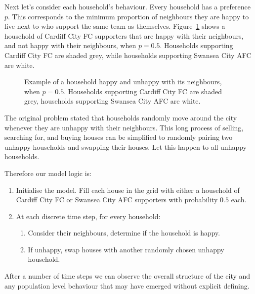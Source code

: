 Next let's consider each household's behaviour.
Every household has a preference $p$.
This corresponds to the minimum proportion of neighbours they are happy to live
next to who support the same team as themselves.
Figure~\ref{fig:schelling_happyunhappy} shows a household of Cardiff City FC
supporters that are happy with their neighbours, and not happy with their
neighbours, when $p=0.5$. Households supporting Cardiff City FC are shaded grey,
while households supporting Swansea City AFC are white.

\begin{figure}
\begin{center}
\subfigure[A happy household, with 6 similar neighbours ($\frac{6}{8} > p = 0.5$)]{}
\subfigure[An unhappy household, with 2 similar neighbours ($\frac{2}{8} < p = 0.5$)]{}
\end{center}
\caption{Example of a household happy and unhappy with its neighbours, when
$p=0.5$. Households supporting Cardiff City FC are shaded grey, households
supporting Swansea City AFC are white.}
\label{fig:schelling_happyunhappy}
\end{figure}

The original problem stated that households randomly move around the city
whenever they are unhappy with their neighbours.
This long process of selling, searching for, and buying houses can be simplified
to randomly pairing two unhappy households and swapping their houses.
Let this happen to all unhappy households.

Therefore our model logic is:

\begin{enumerate}
  \item Initialise the model. Fill each house in the grid with either a
  household of Cardiff City FC or Swansea City AFC supporters with
  probability $0.5$ each.
  \item At each discrete time step, for every household:
  \begin{enumerate}
    \item Consider their neighbours, determine if the household is happy.
    \item If unhappy, swap houses with another randomly chosen unhappy
    household.
  \end{enumerate}
\end{enumerate}

After a number of time steps we can observe the overall structure of the city
and any population level behaviour that may have emerged without explicit
defining.

